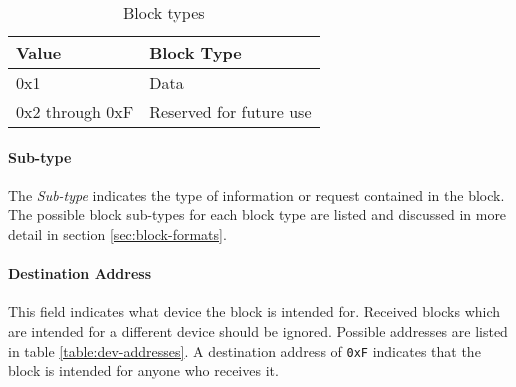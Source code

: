 \begin{table}[H]
    \centering
    \begin{tabular}{@{}ll@{}}
        \toprule
        Value           & Block Type              \\
        \midrule
        0x1             & Data                    \\
        0x2 through 0xF & Reserved for future use \\
        \bottomrule
    \end{tabular}
    \caption{Block types}
    \label{table:block-types}
\end{table}

\paragraph{Sub-type}
The \emph{Sub-type} indicates the type of information or request contained in the block. The possible block sub-types
for each block type are listed and discussed in more detail in section \ref{sec:block-formats}.

\paragraph{Destination Address}
This field indicates what device the block is intended for. Received blocks which are intended for a different device
should be ignored. Possible addresses are listed in table \ref{table:dev-addresses}. A destination address of
\lstinline{0xF} indicates that the block is intended for anyone who receives it.
